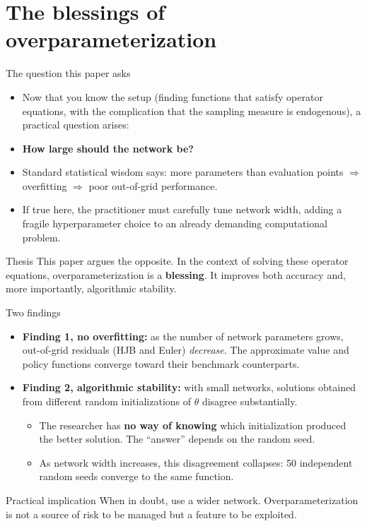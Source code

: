 \documentclass[aspectratio=169,10pt]{beamer}
\newcommand{\emphcolor}[1]{\textbf{\textcolor{emphcolorval}{#1}}}
\begin{document}
\section{\textcolor{KahouBlack}{The blessings of overparameterization}}

\begin{frame}{The question this paper asks}
	\begin{itemize}
		\item Now that you know the setup (finding functions that satisfy operator equations, with the complication that the sampling measure is endogenous), a practical question arises:
		\vspace{0.05in}
		\item \emphcolor{How large should the network be?}
		\vspace{0.05in}
		\item Standard statistical wisdom says: more parameters than evaluation points $\Rightarrow$ overfitting $\Rightarrow$ poor out-of-grid performance.
		\item If true here, the practitioner must carefully tune network width, adding a fragile hyperparameter choice to an already demanding computational problem.
	\end{itemize}
	\begin{block}{Thesis}
		This paper argues the opposite. In the context of solving these operator equations, overparameterization is a \emphcolor{blessing}. It improves both accuracy and, more importantly, algorithmic stability.
	\end{block}
\end{frame}

\begin{frame}{Two findings}
	\begin{itemize}
		\item \emphcolor{Finding 1, no overfitting:} as the number of network parameters grows, out-of-grid residuals (HJB and Euler) \emph{decrease}. The approximate value and policy functions converge toward their benchmark counterparts.
		\item \emphcolor{Finding 2, algorithmic stability:} with small networks, solutions obtained from different random initializations of $\theta$ disagree substantially.
		\begin{itemize}
			\item The researcher has \emphcolor{no way of knowing} which initialization produced the better solution. The ``answer'' depends on the random seed.
			\item As network width increases, this disagreement collapses: 50 independent random seeds converge to the same function.
		\end{itemize}
	\end{itemize}
	\begin{block}{Practical implication}
		When in doubt, use a wider network. Overparameterization is not a source of risk to be managed but a feature to be exploited.
	\end{block}
\end{frame}
\end{document}
